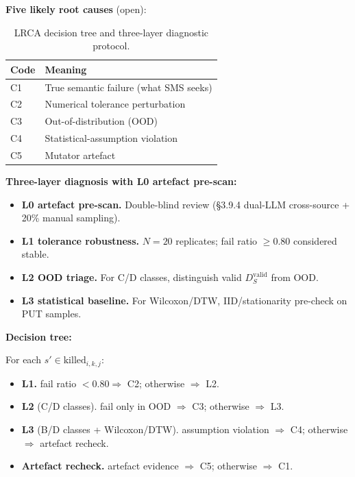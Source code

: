 \documentclass[acmsmall,screen,review]{acmart}
\begin{document}
\textbf{Five likely root causes} (open):

{\def\LTcaptype{table} %
\begin{longtable}[]{@{}ll@{}}
\caption{LRCA decision tree and three-layer diagnostic protocol.}\label{tab:p2-15}\\
\toprule\noalign{}
Code & Meaning \\
\midrule\noalign{}
\endfirsthead
\endhead
\bottomrule\noalign{}
\endlastfoot
C1 & True semantic failure (what SMS seeks) \\
C2 & Numerical tolerance perturbation \\
C3 & Out-of-distribution (OOD) \\
C4 & Statistical-assumption violation \\
C5 & Mutator artefact \\
\end{longtable}
}

\textbf{Three-layer diagnosis with L0 artefact pre-scan:}

\begin{itemize}
\item \textbf{L0 artefact pre-scan.} Double-blind review (§3.9.4 dual-LLM cross-source + 20\% manual sampling).
\item \textbf{L1 tolerance robustness.} $N = 20$ replicates; fail ratio $\geq 0.80$ considered stable.
\item \textbf{L2 OOD triage.} For C/D classes, distinguish valid $D_S^{\text{valid}}$ from OOD.
\item \textbf{L3 statistical baseline.} For Wilcoxon/DTW, IID/stationarity pre-check on PUT samples.
\end{itemize}

\textbf{Decision tree:}

For each $s' \in \mathrm{killed}_{i,k,j}$:
\begin{itemize}
\item \textbf{L1.} fail ratio $< 0.80 \Rightarrow$ C2; otherwise $\Rightarrow$ L2.
\item \textbf{L2} (C/D classes). fail only in OOD $\Rightarrow$ C3; otherwise $\Rightarrow$ L3.
\item \textbf{L3} (B/D classes + Wilcoxon/DTW). assumption violation $\Rightarrow$ C4; otherwise $\Rightarrow$ artefact recheck.
\item \textbf{Artefact recheck.} artefact evidence $\Rightarrow$ C5; otherwise $\Rightarrow$ C1.
\end{itemize}
\end{document}

